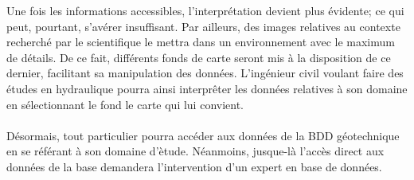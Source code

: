 \par
Une fois les informations accessibles, l'interprétation devient 
plus évidente; ce qui peut, pourtant, s'avérer insuffisant. Par 
ailleurs, des images relatives au contexte recherché par le scientifique 
le mettra dans un environnement avec le maximum de détails. De ce fait, 
différents fonds de carte seront mis 
à la disposition de ce dernier, facilitant sa manipulation des données. 
L'ingénieur civil voulant faire des études en hydraulique pourra ainsi 
interprêter les données relatives à son domaine en sélectionnant 
le fond le carte qui lui convient.
\paragraph{}
Désormais, tout particulier pourra accéder aux données de la BDD 
géotechnique en se référant à son domaine d'ètude. Néanmoins, jusque-là
l'accès direct aux données de la base demandera l'intervention d'un 
expert en base de données.